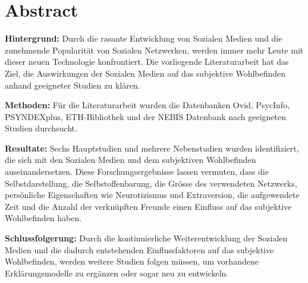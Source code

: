%
%
\thispagestyle{empty} 
\chapter*{Abstract}\label{abstract}
\textbf{Hintergrund:} Durch die rasante Entwicklung von Sozialen Medien und die zunehmende Popularität von Sozialen Netzwerken, werden immer mehr Leute mit dieser neuen Technologie konfrontiert. Die vorliegende Literaturarbeit hat das Ziel, die Auswirkungen der Sozialen Medien auf das subjektive Wohlbefinden anhand geeigneter Studien zu klären. \par 
\textbf{Methoden:} Für die Literaturarbeit wurden die Datenbanken Ovid, PsycInfo, PSYNDEXplus, ETH-Bibliothek und der NEBIS Datenbank nach geeigneten Studien durchsucht.\par 
\textbf{Resultate:} Sechs Hauptstudien und mehrere Nebenstudien wurden identifiziert, die sich mit den Sozialen Medien und dem subjektiven Wohlbefinden auseinandersetzen. Diese Forschungsergebnisse lassen vermuten, dass die Selbstdarstellung, die Selbstoffenbarung, die Grösse des verwendeten Netzwerks, persönliche Eigenschaften wie Neurotizismus und Extraversion, die aufgewendete Zeit und die Anzahl der verknüpften Freunde einen Einfluss auf das subjektive Wohlbefinden haben.\par 
\textbf{Schlussfolgerung:} Durch die kontinuierliche Weiterentwicklung der Sozialen Medien und die dadurch entstehenden Einflussfaktoren auf das subjektive Wohlbefinden, werden weitere Studien folgen müssen, um vorhandene Erklärungsmodelle zu ergänzen oder sogar neu zu entwickeln.\par 

